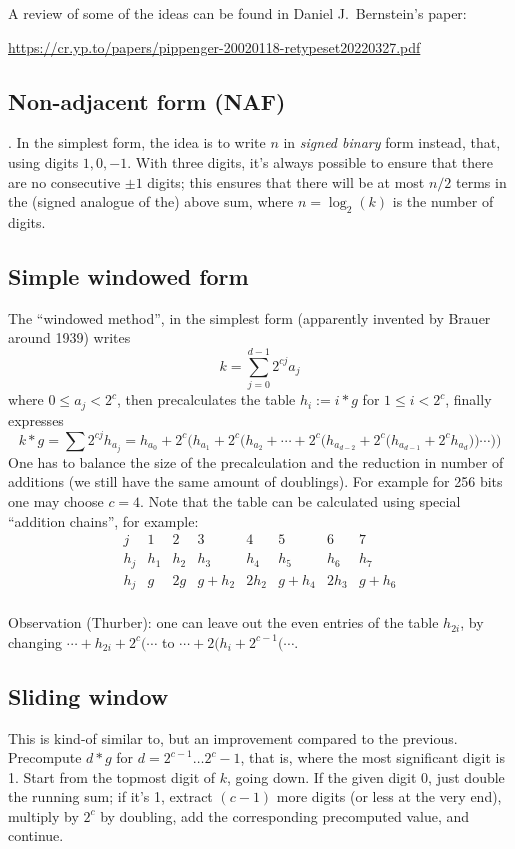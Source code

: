 \documentclass[12pt,draft,a4paper,openany,oneside]{amsbook}
\theoremstyle{plain}
\theoremstyle{definition}
\begin{document}
A review of some of the ideas can be found in Daniel J.~Bernstein's paper:

\noindent
\url{https://cr.yp.to/papers/pippenger-20020118-retypeset20220327.pdf}


\subsection{Non-adjacent form (NAF)}.
In the simplest form, the idea is to write $n$ in \emph{signed binary} form
instead, that, using digits $1,0,-1$. With three digits, it's always
possible to ensure that there are no consecutive $\pm 1$ digits; this ensures
that there will be at most $n/2$ terms in the (signed analogue of the) 
above sum, where $n=\log_2(k)$ is the number of digits.


\subsection{Simple windowed form}
The ``windowed method'', in the simplest form (apparently invented by Brauer around 1939)
writes 
\[ k = \sum_{j=0}^{d-1} 2^{cj} a_j \]
where $0\le a_j < 2^c$, then precalculates the table $h_{i}:=i*g$ for
$1\le i < 2^c$, finally expresses
\[ k*g = \sum 2^{cj} h_{a_j} = h_{a_0} + 2^c\Big( h_{a_1} + 2^c\Big(h_{a_2} + \cdots + 2^c\Big( h_{a_{d-2}} + 2^c\Big(h_{a_{d-1}} + 2^c h_{a_d} \Big)\Big)\cdots \Big)\Big) \]
One has to balance the size of the precalculation and the reduction in number of additions
(we still have the same amount of doublings). For example for 256 bits one may choose
$c=4$. Note that the table can be calculated using special ``addition chains'',
for example:
\[\begin{array}{c|ccccccc}
j   &   1 &   2 &   3 &   4 &   5 &   6 &   7 \\ \hline
h_j & h_1 & h_2 & h_3 & h_4 & h_5 & h_6 & h_7 \\
h_j & g & 2g & g+h_2 & 2h_2 & g+h_4 & 2h_3 & g+h_6\\
\end{array}
\]

Observation (Thurber): one can leave out the even entries of the table $h_{2i}$,
by changing $\cdots+h_{2i}+2^c(\cdots$ to $\cdots+2(h_{i}+2^{c-1}(\cdots$.


\subsection{Sliding window}
This is kind-of similar to, but an improvement compared to the previous.
Precompute $d*g$ for $d=2^{c-1}\dots 2^c-1$, that is, where the most significant digit is 1.
Start from the topmost digit of $k$, going down. If the given digit 0, just double
the running sum; if it's 1, extract $(c-1)$ more digits (or less at the very end),
multiply by $2^c$ by doubling, add the corresponding precomputed value, and continue.
\end{document}
